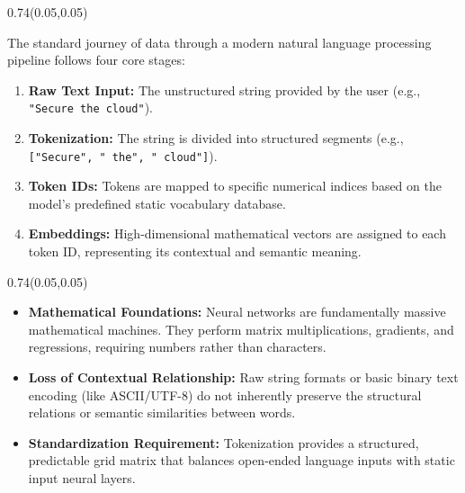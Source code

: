 \documentclass[aspectratio=169]{beamer}
\begin{document}
	\begin{frame}{}
		\setlength{\TPHorizModule}{\textwidth}
		\setlength{\TPVertModule}{\textwidth}
		\begin{textblock}{0.74}(0.05,0.05)
			\bfseries\large{}
		\end{textblock}
		
		\vspace{2em}
		The standard journey of data through a modern natural language processing pipeline follows four core stages:
		\vspace{1em}
		\begin{enumerate}
			\item \textbf{Raw Text Input:} The unstructured string provided by the user (e.g., \texttt{"Secure the cloud"}).
			\item \textbf{Tokenization:} The string is divided into structured segments (e.g., \texttt{["Secure", " the", " cloud"]}).
			\item \textbf{Token IDs:} Tokens are mapped to specific numerical indices based on the model's predefined static vocabulary database.
			\item \textbf{Embeddings:} High-dimensional mathematical vectors are assigned to each token ID, representing its contextual and semantic meaning.
		\end{enumerate}
	\end{frame}
	
	\begin{frame}{}
		\setlength{\TPHorizModule}{\textwidth}
		\setlength{\TPVertModule}{\textwidth}
		\begin{textblock}{0.74}(0.05,0.05)
			\bfseries\large{}
		\end{textblock}
		
		\vspace{2em}
		\begin{itemize}
			\item \textbf{Mathematical Foundations:} Neural networks are fundamentally massive mathematical machines. They perform matrix multiplications, gradients, and regressions, requiring numbers rather than characters.
			\item \textbf{Loss of Contextual Relationship:} Raw string formats or basic binary text encoding (like ASCII/UTF-8) do not inherently preserve the structural relations or semantic similarities between words.
			\item \textbf{Standardization Requirement:} Tokenization provides a structured, predictable grid matrix that balances open-ended language inputs with static input neural layers.
		\end{itemize}
	\end{frame}
	
\end{document}
